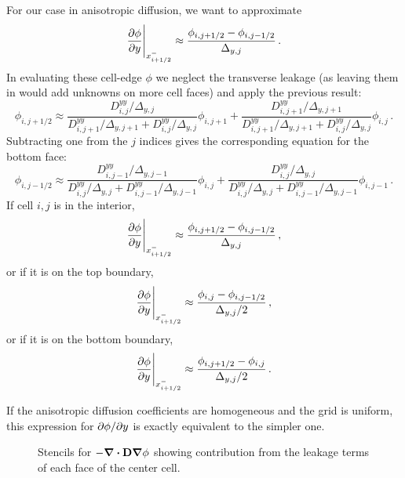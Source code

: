 For our case in anisotropic diffusion, we want to approximate 
\begin{equation*}
  \frac{\partial \phi}{\partial y} \Bigg|_{x_{i+1/2}^-} \approx \frac{\phi_{i,j+1/2} -
  \phi_{i,j-1/2}}{\Delta_{y,j}} \,.
\end{equation*}
In evaluating these cell-edge $\phi$ we neglect the transverse leakage (as
leaving them in would add unknowns on more cell faces) and apply the previous
result:
\begin{equation*}
  \phi_{i,j+1/2} \approx
  \frac{D_{i,j}^{yy} / \Delta_{y,j}}{D_{i,j+1}^{yy} / \Delta_{y,j+1} +
  D_{i,j}^{yy} / \Delta_{y,j}} \phi_{i,j+1}
+ \frac{D_{i,j+1}^{yy} / \Delta_{y,j+1}}{D_{i,j+1}^{yy} / \Delta_{y,j+1} +
D_{i,j}^{yy} / \Delta_{y,j}} \phi_{i,j} \,.
\end{equation*}
Subtracting one from the $j$ indices gives the corresponding equation for the
bottom face:
\begin{equation*}
  \phi_{i,j-1/2} \approx
  \frac{D_{i,j-1}^{yy} / \Delta_{y,j-1}}{D_{i,j}^{yy} / \Delta_{y,j} +
  D_{i,j-1}^{yy} / \Delta_{y,j-1}} \phi_{i,j}
+ \frac{D_{i,j}^{yy} / \Delta_{y,j}}{D_{i,j}^{yy} / \Delta_{y,j} +
D_{i,j-1}^{yy} / \Delta_{y,j-1}} \phi_{i,j-1} \,.
\end{equation*}
If cell $i,j$ is in the interior, 
\begin{equation*}
  \frac{\partial \phi}{\partial y} \Bigg|_{x_{i+1/2}^-} \approx \frac{\phi_{i,j+1/2} -
  \phi_{i,j-1/2}}{\Delta_{y,j}} \,,
\end{equation*}
or if it is on the top boundary,
\begin{equation*}
  \frac{\partial \phi}{\partial y} \Bigg|_{x_{i+1/2}^-} \approx \frac{\phi_{i,j} -
  \phi_{i,j-1/2}}{\Delta_{y,j} / 2} \,,
\end{equation*}
or if it is on the bottom boundary,
\begin{equation*}
  \frac{\partial \phi}{\partial y} \Bigg|_{x_{i+1/2}^-} \approx \frac{\phi_{i,j+1/2} -
  \phi_{i,j}}{\Delta_{y,j} / 2} \,.
\end{equation*}

If the anisotropic diffusion coefficients are homogeneous and the grid is
uniform, this expression for ${\partial \phi}/{\partial y}$ is exactly equivalent to the
simpler one.

\begin{figure}[htb]
  \centering
  \caption{Stencils for $- \bm{\nabla} \bm{\cdot} \mathbf{D} \bm{\nabla} \phi$ showing contribution
  from the leakage terms of each face of the center cell.}
  \label{fig:anisoStencils}
\end{figure}


